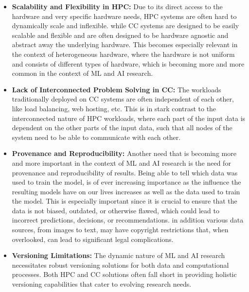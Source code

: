 \begin{itemize}
    \item \textbf{Scalability and Flexibility in \ac{HPC}:}
        Due to its direct access to the hardware and very specific hardware needs, \ac{HPC} systems are often hard to dynamically scale and inflexible. 
        while \ac{CC} systems are designed to be easily scalable and flexible and are often designed to be hardware agnostic and abstract away the underlying hardware.
        This becomes especially relevant in the context of heterogeneous hardware, where the hardware is not uniform and consists of different types of hardware,
        which is becoming more and more common in the context of ML and AI research.
      
    \item \textbf{Lack of Interconnected Problem Solving in \ac{CC}:} 
        The workloads traditionally deployed on \ac{CC} systems are often independent of each other, like load balancing, web hosting, etc. 
        This is in stark contrast to the interconnected nature of \ac{HPC} workloads, where each part of the input data is dependent on the other parts of the input data,
        such that all nodes of the system need to be able to communicate with each other.

    \item \textbf{Provenance and Reproducibility:}
        Another need that is becoming more and more important in the context of ML and AI research is the need for provenance and reproducibility of results.
        Being able to tell which data was used to train the model, is of ever increasing importance as the influence the resulting models have on our lives increases as well as the data used to train the model.
        This is especially important since it is crucial to ensure that the data is not biased, outdated, or otherwise flawed, which could lead to incorrect predictions, decisions, or recommendations. 
        in addition various data sources, from images to text, may have copyright restrictions that, when overlooked, can lead to significant legal complications.

    \item \textbf{Versioning Limitations:} 
        The dynamic nature of ML and AI research necessitates robust versioning solutions for both data and computational processes.
        Both \ac{HPC} and \ac{CC} solutions often fall short in providing holistic versioning capabilities that cater to evolving research needs.

        
\end{itemize}

